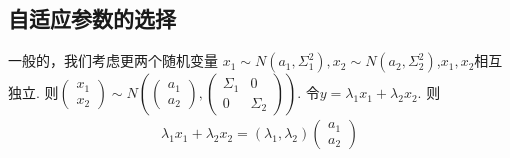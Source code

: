 \documentclass{amsart}
\begin{document}
\subsection{自适应参数的选择}
  一般的，我们考虑更两个随机变量
  $x_1 \sim N(a_1,\Sigma_1^2),x_2 \sim N(a_2,\Sigma_2^2)$,$x_1,x_2$相互独立.
  则$
  \begin{pmatrix}
    x_1\\
    x_2
  \end{pmatrix}
 \sim N\left(  \begin{pmatrix}
    a_1\\
    a_2
  \end{pmatrix}
  ,\begin{pmatrix}
    \Sigma_1 & 0\\
    0 & \Sigma_2
  \end{pmatrix}
  \right)$.
  令$y=\lambda_1 x_1 +\lambda_2 x_2$.
  则
  \begin{equation}
    \label{eq:01}
        \begin{aligned}
\lambda_1x_1+\lambda_2x_2=(\lambda_1,\lambda_2)
\begin{pmatrix}
  a_1\\
  a_2
\end{pmatrix}
    \end{aligned}
  \end{equation}
\end{document}
